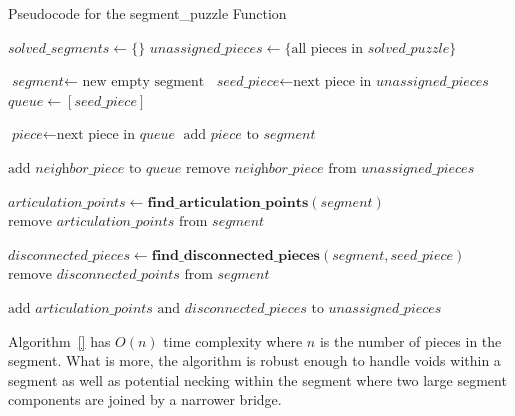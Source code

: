 \begin{algorithm}
\caption{Pseudocode for the segment\_puzzle Function}\label{alg:segmentPuzzle}
\begin{algorithmic}[1]
    \State $\textit{solved\_segments} \gets \{ \}$
    \State $\textit{unassigned\_pieces} \gets \{ \text{all pieces in } \textit{solved\_puzzle} \}$
\item[]
        \State $\textit{segment} \gets \text{ new empty segment}$
        \State $\textit{seed\_piece} \gets \text{next piece in } \textit{unassigned\_pieces}$
        \State $\textit{queue} \gets [\textit{seed\_piece}]$
\item[]
            \State $\textit{piece} \gets \text{next piece in }\textit{queue}$
            \State $\text{add } \textit{piece} \text{ to } \textit{segment}$
\item[]
            		\State $\text{add } \textit{neighbor\_piece} \text{ to } \textit{queue}$
            		\State $\text{remove } \textit{neighbor\_piece} \text{ from } \textit{unassigned\_pieces}$
            	\EndIf
            \EndFor
        \EndWhile
\item[]
        \State $\textit{articulation\_points} \gets \textbf{find\_articulation\_points}(\textit{segment})$
        \State $\text{remove } \textit{articulation\_points} \text{ from } \textit{segment}$
\item[]
		\State $\textit{disconnected\_pieces} \gets \textbf{find\_disconnected\_pieces}(\textit{segment},\textit{seed\_piece})$        
        \State $\text{remove } \textit{disconnected\_points} \text{ from } \textit{segment}$
\item[]
        \State $\text{add } \textit{articulation\_points} \text{ and } \textit{disconnected\_pieces} \text{ to } \textit{unassigned\_pieces}$
    \EndWhile
\EndProcedure
\end{algorithmic}
\end{algorithm}

Algorithm~\ref{} has $O(n)$ time complexity where $n$ is the number of pieces in the segment.  What is more, the algorithm is robust enough to handle voids within a segment as well as potential necking within the segment where two large segment components are joined by a narrower bridge.

